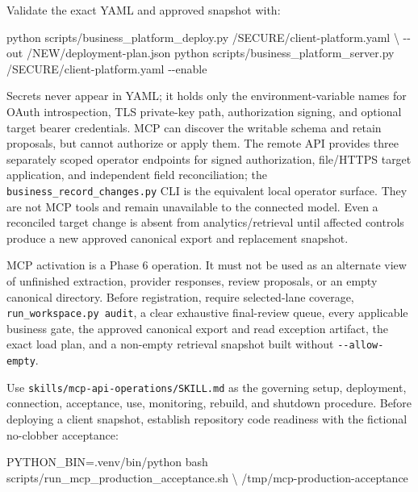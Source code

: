 \documentclass[
]{article}
\newenvironment{Shaded}{}{}
\newcommand{\AttributeTok}[1]{\textcolor[rgb]{0.49,0.56,0.16}{#1}}
\newcommand{\DataTypeTok}[1]{\textcolor[rgb]{0.56,0.13,0.00}{#1}}
\newcommand{\ExtensionTok}[1]{#1}
\newcommand{\FunctionTok}[1]{\textcolor[rgb]{0.02,0.16,0.49}{#1}}
\newcommand{\NormalTok}[1]{#1}
\newcommand{\OperatorTok}[1]{\textcolor[rgb]{0.40,0.40,0.40}{#1}}
\newcommand{\VariableTok}[1]{\textcolor[rgb]{0.10,0.09,0.49}{#1}}
\begin{document}
Validate the exact YAML and approved snapshot with:

\begin{Shaded}
\begin{Highlighting}[]
\ExtensionTok{python}\NormalTok{ scripts/business\_platform\_deploy.py /SECURE/client{-}platform.yaml }\DataTypeTok{\textbackslash{}}
  \AttributeTok{{-}{-}out}\NormalTok{ /NEW/deployment{-}plan.json}
\ExtensionTok{python}\NormalTok{ scripts/business\_platform\_server.py /SECURE/client{-}platform.yaml }\AttributeTok{{-}{-}enable}
\end{Highlighting}
\end{Shaded}

Secrets never appear in YAML; it holds only the environment-variable
names for OAuth introspection, TLS private-key path, authorization
signing, and optional target bearer credentials. MCP can discover the
writable schema and retain proposals, but cannot authorize or apply
them. The remote API provides three separately scoped operator endpoints
for signed authorization, file/HTTPS target application, and independent
field reconciliation; the
\texttt{business\_\allowbreak{}record\_\allowbreak{}changes.py} CLI is
the equivalent local operator surface. They are not MCP tools and remain
unavailable to the connected model. Even a reconciled target change is
absent from analytics/retrieval until affected controls produce a new
approved canonical export and replacement snapshot.

MCP activation is a Phase 6 operation. It must not be used as an
alternate view of unfinished extraction, provider responses, review
proposals, or an empty canonical directory. Before registration, require
selected-lane coverage, \texttt{run\_\allowbreak{}workspace.py audit}, a
clear exhaustive final-review queue, every applicable business gate, the
approved canonical export and read exception artifact, the exact load
plan, and a non-empty retrieval snapshot built without
\texttt{-\/-allow-empty}.

Use
\texttt{skills/\allowbreak{}mcp-\allowbreak{}api-\allowbreak{}operations/\allowbreak{}SKILL.md}
as the governing setup, deployment, connection, acceptance, use,
monitoring, rebuild, and shutdown procedure. Before deploying a client
snapshot, establish repository code readiness with the fictional
no-clobber acceptance:

\begin{Shaded}
\begin{Highlighting}[]
\VariableTok{PYTHON\_BIN}\OperatorTok{=}\NormalTok{.venv/bin/python }\FunctionTok{bash}\NormalTok{ scripts/run\_mcp\_production\_acceptance.sh }\DataTypeTok{\textbackslash{}}
\NormalTok{  /tmp/mcp{-}production{-}acceptance}
\end{Highlighting}
\end{Shaded}
\end{document}
